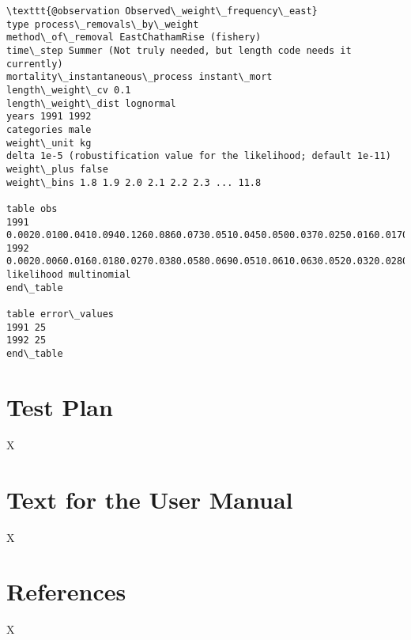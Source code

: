 \documentclass[a4paper,11pt,twoside,pdftex,draft]{article}
\begin{document}
\begin{lstlisting}
\texttt{@observation Observed\_weight\_frequency\_east}
type process\_removals\_by\_weight
method\_of\_removal EastChathamRise (fishery)
time\_step Summer (Not truly needed, but length code needs it currently)
mortality\_instantaneous\_process instant\_mort
length\_weight\_cv 0.1
length\_weight\_dist lognormal
years 1991 1992
categories male
weight\_unit kg
delta 1e-5 (robustification value for the likelihood; default 1e-11)
weight\_plus false
weight\_bins 1.8 1.9 2.0 2.1 2.2 2.3 ... 11.8

table obs
1991 0.0020.0100.0410.0940.1260.0860.0730.0510.0450.0500.0370.0250.0160.0170.0110.0080.0110.0110.0090.0120.0130.0090.0100.0090.0100.0070.0080.0060.0050.0100.0080.0140.0080.0120.0060.0070.0090.0050.0070.0060.0040.0060.0040.0040.0070.0050.0020.0060.0040.0030.0040.0020.0040.0030.0020.0020.0020.0010.0020.0030.0010.0020.0010.0010.0010.0010.0010.0010.0010.0000.0010.0010.0000.0010.0010.0010.0010.0000.0010.0010.0010.0010.0010.0010.0000.0010.0000.0010.0000.0000.0010.0000.0000.0000.0000.0000.0000.0000.0000.001
1992 0.0020.0060.0160.0180.0270.0380.0580.0690.0510.0610.0630.0520.0320.0280.0210.0180.0130.0120.0080.0110.0120.0070.0120.0120.0150.0070.0090.0110.0090.0100.0140.0130.0120.0190.0110.0130.0130.0090.0100.0140.0080.0090.0060.0060.0080.0080.0050.0080.0070.0060.0030.0060.0060.0040.0020.0040.0070.0030.0040.0030.0020.0030.0020.0020.0020.0020.0020.0020.0020.0020.0020.0010.0010.0010.0020.0020.0010.0020.0020.0020.0010.0010.0010.0020.0010.0010.0010.0010.0010.0000.0010.0010.0000.0010.0010.0000.0000.0010.0000.001
likelihood multinomial
end\_table

table error\_values
1991 25
1992 25
end\_table
\end{lstlisting}

\section{Test Plan}

X

\section{Text for the User Manual}

X

\section{References}

X
\end{document}
